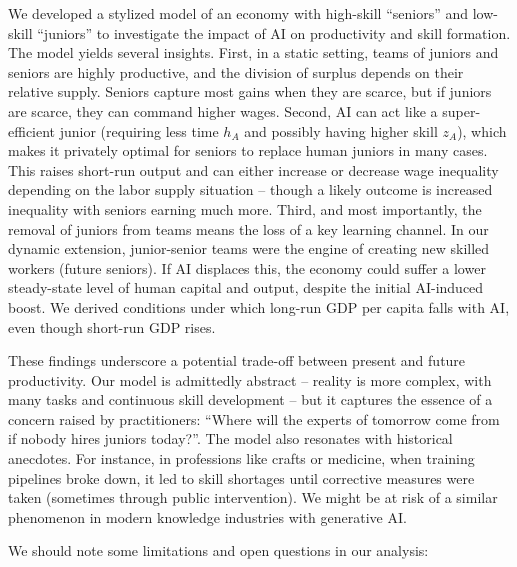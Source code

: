 \documentclass[12pt]{article}
\begin{document}
We developed a stylized model of an economy with high-skill ``seniors''
and low-skill ``juniors'' to investigate the impact of AI on
productivity and skill formation. The model yields several insights.
{First}, in a static setting, teams of juniors and seniors are
highly productive, and the division of surplus depends on their relative
supply. Seniors capture most gains when they are scarce, but if juniors
are scarce, they can command higher wages. {Second}, AI can act
like a super-efficient junior (requiring less time \(h_A\) and possibly
having higher skill \(z_A\)), which makes it privately optimal for
seniors to replace human juniors in many cases. This raises short-run
output and can either increase or decrease wage inequality depending on
the labor supply situation -- though a likely outcome is increased
inequality with seniors earning much more. {Third}, and most
importantly, the removal of juniors from teams means the {loss of
a key learning channel}. In our dynamic extension, junior-senior teams
were the engine of creating new skilled workers (future seniors). If AI
displaces this, the economy could suffer a {lower steady-state
level of human capital and output}, despite the initial AI-induced
boost. We derived conditions under which long-run GDP per capita falls
with AI, even though short-run GDP rises.

These findings underscore a potential {trade-off between present
and future productivity}. Our model is admittedly abstract -- reality is
more complex, with many tasks and continuous skill development -- but it
captures the essence of a concern raised by practitioners: {``Where
will the experts of tomorrow come from if nobody hires juniors
today?''}. The model also resonates with historical anecdotes. For
instance, in professions like crafts or medicine, when training
pipelines broke down, it led to skill shortages until corrective
measures were taken (sometimes through public intervention). We might be
at risk of a similar phenomenon in modern knowledge industries with
generative AI.

We should note some {limitations and open questions} in our
analysis:
\end{document}
